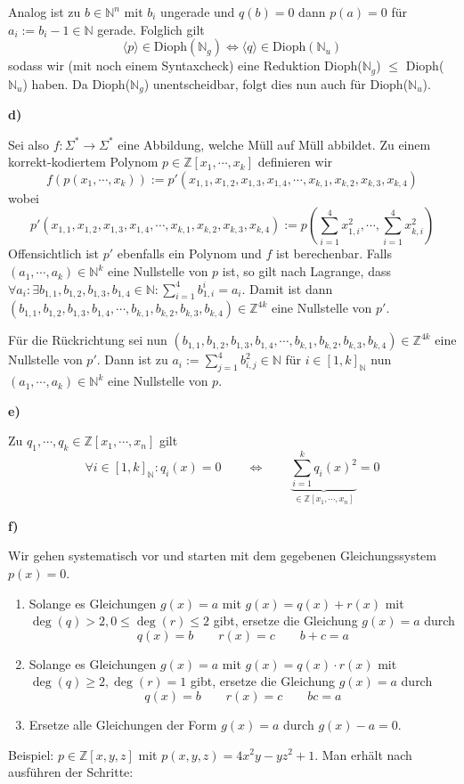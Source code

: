 \documentclass[a4paper,graphics,11pt]{article}
\newcommand{\godel}[1]{\langle #1 \rangle}
\begin{document}
Analog ist zu $b \in \mathbb{N}^n$ mit $b_i$ ungerade und $q(b) = 0$ dann $p(a) = 0$ für $a_i := b_i - 1 \in \mathbb{N}$ gerade.
Folglich gilt
$$
    \godel{p} \in \text{Dioph}(\mathbb{N}_g) \iff \godel{q} \in \text{Dioph}(\mathbb{N}_u)
$$
sodass wir (mit noch einem Syntaxcheck) eine Reduktion Dioph($\mathbb{N}_g$) $\leq$ Dioph($\mathbb{N}_u$) haben.
Da Dioph($\mathbb{N}_g$) unentscheidbar, folgt dies nun auch für Dioph($\mathbb{N}_u$).

\newpage

\textbf{d)}

Sei also $f : \Sigma^* \to \Sigma^*$ eine Abbildung, welche Müll auf Müll abbildet. Zu einem korrekt-kodiertem
Polynom $p \in \mathbb{Z}[x_1,\cdots,x_k]$ definieren wir
$$
    f(p(x_1,\cdots,x_k)) := p'(x_{1,1},x_{1,2},x_{1,3},x_{1,4},\cdots,x_{k,1},x_{k,2},x_{k,3},x_{k,4})
$$
wobei
$$
    p'(x_{1,1},x_{1,2},x_{1,3},x_{1,4},\cdots,x_{k,1},x_{k,2},x_{k,3},x_{k,4})
    := p(\sum_{i=1}^{4} x_{1,i}^2, \cdots ,\sum_{i=1}^{4} x_{k,i}^2)
$$
Offensichtlich ist $p'$ ebenfalls ein Polynom und $f$ ist berechenbar. Falls $(a_1,\cdots,a_k) \in \mathbb{N}^k$
eine Nullstelle von $p$ ist, so gilt nach Lagrange, dass $\forall a_i: \exists b_{1,1},b_{1,2},b_{1,3},b_{1,4} \in \mathbb{N}: \sum_{i=1}^{4} b_{1,i}^i = a_i$.
Damit ist dann $(b_{1,1},b_{1,2},b_{1,3},b_{1,4},\cdots,b_{k,1},b_{k,2},b_{k,3},b_{k,4}) \in \mathbb{Z}^{4k}$
eine Nullstelle von $p'$.

Für die Rückrichtung sei nun
$(b_{1,1},b_{1,2},b_{1,3},b_{1,4},\cdots,b_{k,1},b_{k,2},b_{k,3},b_{k,4}) \in \mathbb{Z}^{4k}$
eine Nullstelle von $p'$. Dann ist zu $a_i := \sum_{j=1}^{4} b_{i,j}^2 \in \mathbb{N}$ für $i\in[1,k]_{\mathbb{N}}$ nun
$(a_1,\cdots,a_k) \in \mathbb{N}^k$ eine Nullstelle von $p$.

\strut

\textbf{e)}

Zu $q_1,\cdots,q_k \in \mathbb{Z}[x_1,\cdots,x_n]$ gilt
$$
    \forall i \in [1,k]_{\mathbb{N}}: q_i(x) = 0
    \qquad\iff\qquad
    \underbrace{\sum_{i=1}^{k} q_i(x)^2}_{\in \mathbb{Z}[x_1,\cdots,x_n]} = 0
$$

\textbf{f)}

Wir gehen systematisch vor und starten mit dem gegebenen Gleichungssystem $p(x) = 0$.
\begin{enumerate}
    \item Solange es Gleichungen $g(x) = a$ mit $g(x) = q(x) + r(x)$ mit
        $\deg(q) > 2, 0 \leq \deg(r) \leq 2$ gibt, ersetze die Gleichung $g(x) = a$ durch
        $$
            q(x) = b \qquad r(x) = c \qquad b+c = a
        $$
    \item Solange es Gleichungen $g(x) = a$ mit $g(x) = q(x)\cdot r(x)$ mit
        $\deg(q) \geq 2, \deg(r) = 1$ gibt, ersetze die Gleichung $g(x) = a$ durch
        $$
            q(x) = b \qquad r(x) = c \qquad bc = a
        $$
    \item Ersetze alle Gleichungen der Form $g(x) = a$ durch $g(x) - a = 0$.
\end{enumerate}
Beispiel: $p \in \mathbb{Z}[x,y,z]$ mit $p(x,y,z) = 4x^2y-yz^2+1$. Man erhält nach ausführen der Schritte:
\end{document}
